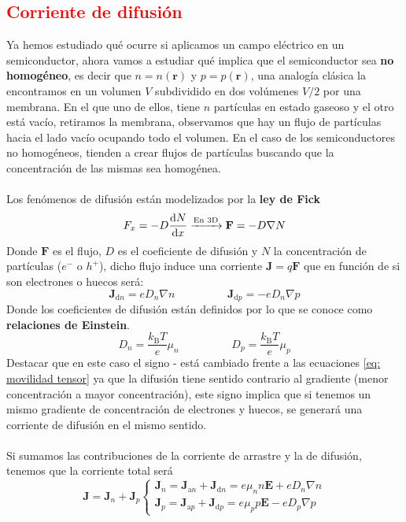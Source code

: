 \subsection{\textcolor{red}{Corriente de difusión}} \label{sec: Corrientes de difusión}
Ya hemos estudiado qué ocurre si aplicamos un campo eléctrico en un semiconductor, ahora vamos a estudiar qué implica que el semiconductor sea \textbf{no homogéneo}, es decir que $n=n(\mathbf{r})$ y $p=p(\mathbf{r})$, una analogía clásica la encontramos en un volumen $V$ subdividido en dos volúmenes  $V/2$ por una membrana. En el que uno de ellos, tiene $n$ partículas en estado gaseoso y el otro está vacío, retiramos la membrana, observamos que hay un flujo de partículas hacia el lado vacío ocupando todo el volumen. En el caso de los semiconductores no homogéneos, tienden a crear flujos de partículas buscando que la concentración de las mismas sea homogénea.\\\\
Los fenómenos de difusión están modelizados por la \textbf{ley de Fick} 
\begin{equation}
    F_x=-D\diff[]{N}{x}  \xrightarrow{\text{En 3D}} \mathbf{F}=-D\nabla N
    \label{eq: difusion}
\end{equation}
Donde $\textbf{F}$ es el flujo, $D$ es el coeficiente de difusión y $N$ la concentración de partículas ($e^-$ o $h^+$), dicho flujo induce una corriente $\mathbf{J}=q\mathbf{F}$ que en función de si son electrones o huecos será:
\begin{equation}
    \mathbf{J}_{\mathrm{d}n}=eD_n\nabla n \hspace{2cm} \mathbf{J}_{\mathrm{d}p}=-eD_n\nabla p
    \label{eq: correinte de difusion}
\end{equation}
Donde los coeficientes de difusión están definidos por lo que se conoce como \textbf{relaciones de Einstein}.
\begin{equation}
    D_n=\frac{k_\mathrm{B}T}{e} \mu_n \hspace{2cm} D_p=\frac{k_\mathrm{B}T}{e} \mu_p
\end{equation}
Destacar que en este caso el signo - está cambiado frente a las ecuaciones \ref{eq: movilidad tensor} ya que la difusión tiene sentido contrario al gradiente (menor concentración a mayor concentración), este signo implica que si tenemos un mismo gradiente de concentración de electrones y huecos, se generará una corriente de difusión en el mismo sentido.\\\\
Si sumamos las contribuciones de la corriente de arrastre y la de difusión, tenemos que la corriente total será 
\begin{equation}
\boxed{
\mathbf{J}=\mathbf{J}_n+\mathbf{J}_p\left\{\begin{array}{l}
\mathbf{J}_n=\mathbf{J}_{\mathrm{a} n}+\mathbf{J}_{\mathrm{d} n}=e \mu_n n \mathbf{E}+e D_n {\nabla} n \\
\mathbf{J}_p=\mathbf{J}_{\mathrm{a} p}+\mathbf{J}_{\mathrm{d} p}=e \mu_p p \mathbf{E}-e D_p {\nabla} p
\end{array}\right.
} %
\label{eq: Densidad de corriente total}
\end{equation}
\newpage

